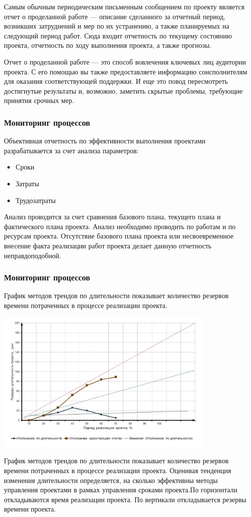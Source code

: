 \documentclass{../industrial-development}
\begin{document}
Самым обычным периодическим письменным сообщением по проекту является отчет о проделанной работе — описание сделанного за отчетный период, возникших затруднений и мер по их устранению, а также планируемых на следующий период работ. Сюда входит отчетность по текущему состоянию проекта, отчетность по ходу выполнения проекта, а также прогнозы.

Отчет о проделанной работе — это способ вовлечения ключевых лиц аудитории проекта. С его помощью вы также предоставляете информацию соисполнителям для оказания соответствующей поддержки. И еще это повод пересмотреть достигнутые результаты и, возможно, заметить скрытые проблемы, требующие принятия срочных мер.

\begin{frame} \frametitle{Мониторинг процессов}
	Объективная отчетность по эффективности выполнения проектами разрабатывается за счет анализа параметров:
	\begin{itemize}
		\item Сроки
		\item Затраты
		\item Трудозатраты
	\end{itemize}
\end{frame}
\lecturenotes

Анализ проводится за счет сравнения базового плана, текущего плана и фактического плана проекта. Анализ необходимо проводить по работам и по ресурсам проекта. Отсутствие базового плана проекта или несвоевременное внесение факта реализации работ проекта делает данную отчетность неправдоподобной. 

\begin{frame} \frametitle{Мониторинг процессов}
	\begin{definition}
		График методов трендов по длительности показывает количество резервов времени потраченных в процессе реализации проекта.
	\end{definition}
	\centerline{\includegraphics[width=0.8\textwidth]{trend.jpg}}
\end{frame}
\lecturenotes

График методов трендов по длительности показывает количество резервов времени потраченных в процессе реализации проекта. Оценивая тенденция изменения длительности определяется, на сколько эффективны методы управления проектами в рамках управления сроками проекта.По горизонтали откладываются время реализации проекта. По вертикали откладывается резервы времени проекта.


    
\end{document}

